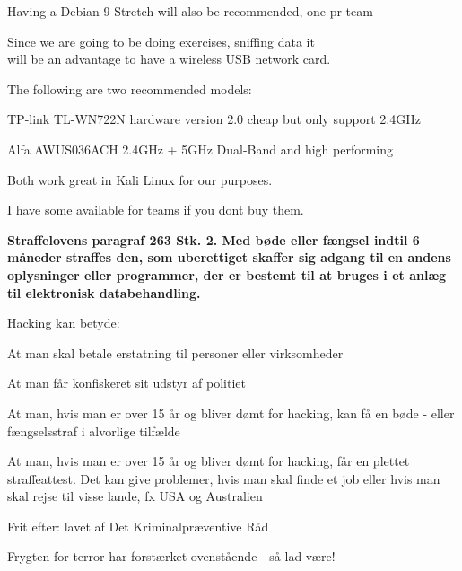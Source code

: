 \documentclass[Screen16to9,17pt]{foils}
\begin{document}
\centerline{Having a Debian 9 Stretch will also be recommended, one pr team}


Since we are going to be doing exercises, sniffing data it \\
will be an advantage to have a wireless USB network card.
\begin{list2}
\item The following are two recommended models:
\item TP-link TL-WN722N hardware version 2.0 cheap but only support 2.4GHz
\item Alfa AWUS036ACH 2.4GHz + 5GHz Dual-Band and high performing
\item   Both work great in Kali Linux for our purposes.
\end{list2}

I have some available for teams if you dont buy them.



\vskip 1cm
{\bfseries Straffelovens paragraf 263 Stk. 2. Med bøde eller fængsel
  indtil 6 måneder
straffes den, som uberettiget skaffer sig adgang til en andens
oplysninger eller programmer, der er bestemt til at bruges i et anlæg
til elektronisk databehandling.}

Hacking kan betyde:
\begin{list2}
\item At man skal betale erstatning til personer eller virksomheder
\item At man får konfiskeret sit udstyr af politiet
\item At man, hvis man er over 15 år og bliver dømt for hacking, kan
  få en bøde - eller fængselsstraf i alvorlige tilfælde
\item At man, hvis man er over 15 år og bliver dømt for hacking, får
en plettet straffeattest. Det kan give problemer, hvis man skal finde
et job eller hvis man skal rejse til visse lande, fx USA og
Australien
\item Frit efter:  lavet af Det
  Kriminalpræventive Råd
\item Frygten for terror har forstærket ovenstående - så lad være!
\end{list2}




\end{document}
